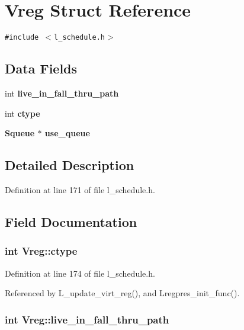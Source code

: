 \section{Vreg Struct Reference}
\label{structVreg}
{\tt \#include $<$l\_\-schedule.h$>$}

\subsection*{Data Fields}
\begin{CompactItemize}
\item 
int \bf{live\_\-in\_\-fall\_\-thru\_\-path}
\item 
int \bf{ctype}
\item 
\bf{Squeue} $\ast$ \bf{use\_\-queue}
\end{CompactItemize}


\subsection{Detailed Description}




Definition at line 171 of file l\_\-schedule.h.

\subsection{Field Documentation}
\subsubsection{\setlength{\rightskip}{0pt plus 5cm}int \bf{Vreg::ctype}}\label{structVreg_dd5a9ea90cd35f072502ea849823a36b}




Definition at line 174 of file l\_\-schedule.h.

Referenced by L\_\-update\_\-virt\_\-reg(), and Lregpres\_\-init\_\-func().
\subsubsection{\setlength{\rightskip}{0pt plus 5cm}int \bf{Vreg::live\_\-in\_\-fall\_\-thru\_\-path}}\label{structVreg_cf94cbee2bfe45387349a4db0917e306}




